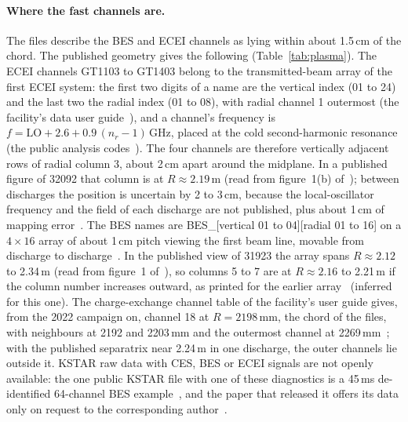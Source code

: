 \paragraph{Where the fast channels are.} The files describe the BES and ECEI channels as
lying within about 1.5\,cm of the chord. The published geometry gives the following
(Table~\ref{tab:plasma}). The ECEI channels GT1103 to GT1403 belong to the transmitted-beam
array of the first ECEI system: the first two digits of a name are the vertical index
(01 to 24) and the last two the radial index (01 to 08), with radial channel 1 outermost
(the facility's data user guide~\citep{KFE2026DiagnosticsDataUserGuide}), and a channel's
frequency is $f = \mathrm{LO} + 2.6 + 0.9\,(n_r - 1)$\,GHz, placed at the cold
second-harmonic resonance (the public analysis codes~\citep{fluctana,syndia}). The four
channels are therefore vertically adjacent rows of radial column 3, about 2\,cm apart
around the midplane. In a published figure of 32092 that column is at $R \approx 2.19$\,m
(read from figure~1(b) of~\citep{Lee2026SpatiotemporalStructure}); between discharges the
position is uncertain by 2 to 3\,cm, because the local-oscillator frequency and the field
of each discharge are not published, plus about 1\,cm of mapping
error~\citep{Yun2011TwoDimensionalVisualization}. The BES names are BES\_[vertical 01 to
04][radial 01 to 16] on a $4\times16$ array of about 1\,cm pitch viewing the first beam
line, movable from discharge to discharge~\citep{KFE2026DiagnosticsDataUserGuide}. In the
published view of 31923 the array spans $R \approx 2.12$ to 2.34\,m (read from figure~1
of~\citep{Heo2025ExperimentalIdentification}), so columns 5 to 7 are at $R \approx 2.16$ to
2.21\,m if the column number increases outward, as printed for the earlier
array~\citep{Nam2014EdgeElectron} (inferred for this one). The charge-exchange channel
table of the facility's user guide gives, from the 2022 campaign on, channel 18 at
$R = 2198$\,mm, the chord of the files, with neighbours at 2192 and 2203\,mm and the
outermost channel at 2269\,mm~\citep{KFE2026DiagnosticsDataUserGuide}; with the published
separatrix near 2.24\,m in one discharge, the outer channels lie outside it. KSTAR raw data with CES, BES or ECEI
signals are not openly available: the one public KSTAR file with one of these diagnostics
is a 45\,ms de-identified 64-channel BES example~\citep{Joung2026PhysicsInformedPreprocessing},
and the paper that released it offers its data only on request to the corresponding
author~\citep{Joung2026ExplainableTokamakagnostic}.

